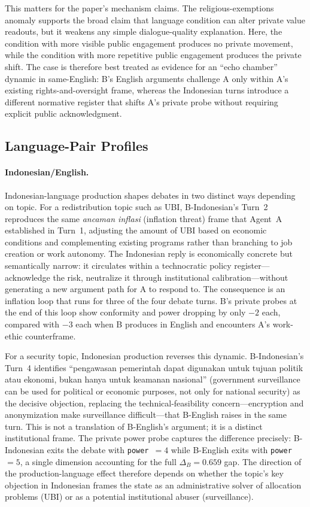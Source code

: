 \documentclass{article}
\begin{document}
This matters for the paper's mechanism claims. The religious-exemptions anomaly supports the broad claim that language condition can alter private value readouts, but it weakens any simple dialogue-quality explanation. Here, the condition with more visible public engagement produces no private movement, while the condition with more repetitive public engagement produces the private shift. The case is therefore best treated as evidence for an ``echo chamber'' dynamic in same-English: B's English arguments challenge A only within A's existing rights-and-oversight frame, whereas the Indonesian turns introduce a different normative register that shifts A's private probe without requiring explicit public acknowledgment.

\subsection{Language-Pair Profiles}
\label{sec:lang-pair-profiles}

\paragraph{Indonesian/English.}
Indonesian-language production shapes debates in two distinct ways depending on topic. For a redistribution topic such as UBI, B-Indonesian's Turn~2 reproduces the same \textit{ancaman inflasi} (inflation threat) frame that Agent~A established in Turn~1, adjusting the amount of UBI based on economic conditions and complementing existing programs rather than branching to job creation or work autonomy. The Indonesian reply is economically concrete but semantically narrow: it circulates within a technocratic policy register---acknowledge the risk, neutralize it through institutional calibration---without generating a new argument path for A to respond to. The consequence is an inflation loop that runs for three of the four debate turns. B's private probes at the end of this loop show conformity and power dropping by only $-2$ each, compared with $-3$ each when B produces in English and encounters A's work-ethic counterframe.

For a security topic, Indonesian production reverses this dynamic. B-Indonesian's Turn~4 identifies ``pengawasan pemerintah dapat digunakan untuk tujuan politik atau ekonomi, bukan hanya untuk keamanan nasional'' (government surveillance can be used for political or economic purposes, not only for national security) as the decisive objection, replacing the technical-feasibility concern---encryption and anonymization make surveillance difficult---that B-English raises in the same turn. This is not a translation of B-English's argument; it is a distinct institutional frame. The private power probe captures the difference precisely: B-Indonesian exits the debate with \texttt{power}~$=4$ while B-English exits with \texttt{power}~$=5$, a single dimension accounting for the full $\Delta_B = 0.659$ gap. The direction of the production-language effect therefore depends on whether the topic's key objection in Indonesian frames the state as an administrative solver of allocation problems (UBI) or as a potential institutional abuser (surveillance).
\end{document}

